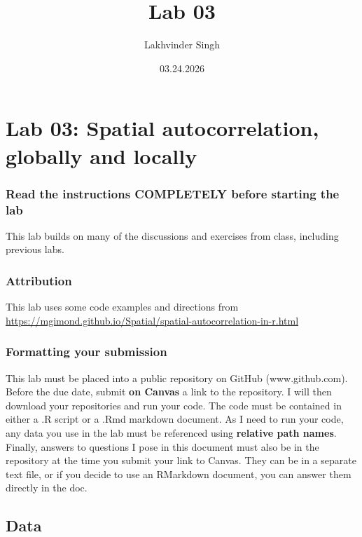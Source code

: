 \documentclass[
]{article}
\title{Lab 03}
\author{Lakhvinder Singh}
\date{03.24.2026}
\begin{document}
\maketitle

\section{Lab 03: Spatial autocorrelation, globally and
locally}\label{lab-03-spatial-autocorrelation-globally-and-locally}

\subsubsection{Read the instructions COMPLETELY before starting the
lab}\label{read-the-instructions-completely-before-starting-the-lab}

This lab builds on many of the discussions and exercises from class,
including previous labs.

\subsubsection{Attribution}\label{attribution}

This lab uses some code examples and directions from
\url{https://mgimond.github.io/Spatial/spatial-autocorrelation-in-r.html}

\subsubsection{Formatting your
submission}\label{formatting-your-submission}

This lab must be placed into a public repository on GitHub
(www.github.com). Before the due date, submit \textbf{on Canvas} a link
to the repository. I will then download your repositories and run your
code. The code must be contained in either a .R script or a .Rmd
markdown document. As I need to run your code, any data you use in the
lab must be referenced using \textbf{relative path names}. Finally,
answers to questions I pose in this document must also be in the
repository at the time you submit your link to Canvas. They can be in a
separate text file, or if you decide to use an RMarkdown document, you
can answer them directly in the doc.

\subsection{Data}\label{data}
\end{document}
